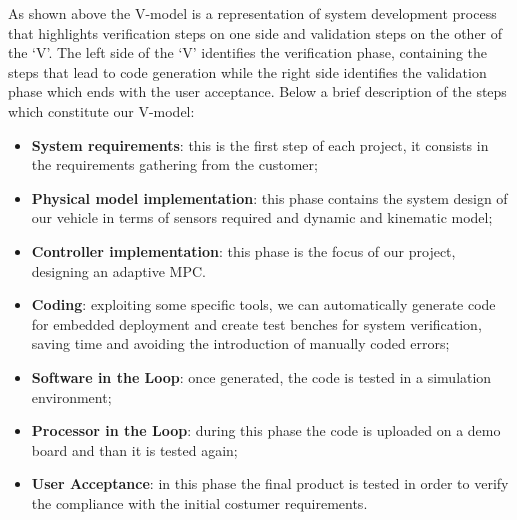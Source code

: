 As shown above the V-model is a representation of system development process that highlights verification steps on one side and validation steps on the other of the ‘V’. The left side of the ‘V’ identifies the verification phase, containing the steps that lead to code generation while the right side identifies the validation phase which ends with the user acceptance.
Below a brief description of the steps which constitute our V-model:
\begin{itemize}
    \item \textbf{System requirements}: this is the first step of each project, it consists in the requirements gathering from the customer;
    \item \textbf{Physical model implementation}: this phase contains the system design of our vehicle in terms of sensors required and dynamic and kinematic model;
    \item \textbf{Controller implementation}: this phase is the focus of our project, designing an adaptive MPC. 
    \item \textbf{Coding}: exploiting some specific tools, we can automatically generate code for embedded deployment and create test benches for system verification, saving time and avoiding the introduction of manually coded errors;
    \item \textbf{Software in the Loop}: once generated, the code is tested in a simulation environment;
    
    \item \textbf{Processor in the Loop}: during this phase the code is uploaded on a demo board and than it is tested again;
    
    \item \textbf{User Acceptance}: in this phase the final product is tested in order to verify the compliance with the initial costumer requirements.
\end{itemize}

